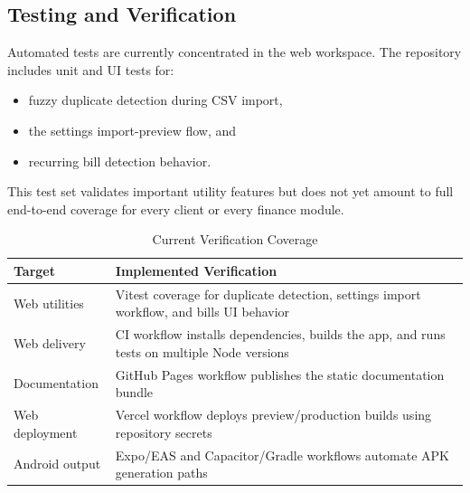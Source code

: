 \documentclass[conference]{IEEEtran}
\begin{document}
\subsection{Testing and Verification}
Automated tests are currently concentrated in the web workspace. The repository includes unit and UI tests for:
\begin{itemize}
\item fuzzy duplicate detection during CSV import,
\item the settings import-preview flow, and
\item recurring bill detection behavior.
\end{itemize}
This test set validates important utility features but does not yet amount to full end-to-end coverage for every client or every finance module.

\begin{table}[t]
\caption{Current Verification Coverage}
\label{tab:verification}
\centering
\begin{tabular}{p{2.2cm}p{4.8cm}}
\toprule
\textbf{Target} & \textbf{Implemented Verification} \\
\midrule
Web utilities & Vitest coverage for duplicate detection, settings import workflow, and bills UI behavior \\
Web delivery & CI workflow installs dependencies, builds the app, and runs tests on multiple Node versions \\
Documentation & GitHub Pages workflow publishes the static documentation bundle \\
Web deployment & Vercel workflow deploys preview/production builds using repository secrets \\
Android output & Expo/EAS and Capacitor/Gradle workflows automate APK generation paths \\
\bottomrule
\end{tabular}
\end{table}
\end{document}
